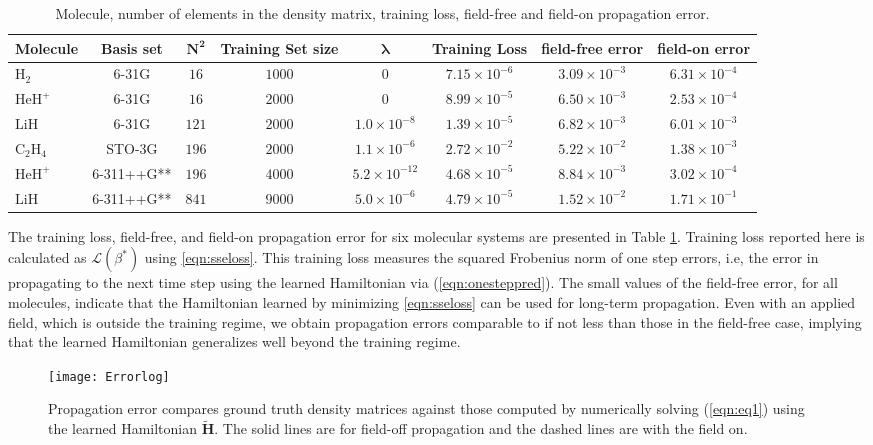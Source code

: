 \documentclass[10pt]{article}
\newcommand{\htwo}{\ensuremath{\text{H}_2} }
\newcommand{\heh}{\ensuremath{\text{HeH}^+} }
\newcommand{\lih}{\ensuremath{\text{LiH}} }
\newcommand{\ethylene}{\ensuremath{\text{C}_2\text{H}_4} }
\begin{document}
\begin{table}[h]%
\centering
\small
\caption{Molecule, number of elements in the density matrix, training loss, field-free and field-on propagation error.\label{tab1}}%
\begin{tabular}{lccccccc}
\hline
\textbf{Molecule} &\textbf{Basis set}  &\textbf{$\mathbf{N^2}$}&\textbf{Training Set size} &${\mathbf{\lambda}}$  & \textbf{Training Loss}  & \textbf{field-free error}  & \textbf{field-on error} \\
\hline
\htwo & 6-31G &$16$&$1000$&$0$ & $7.15 \times 10^{-6}$& $3.09 \times 10^{-3}$ & $6.31 \times 10^{-4}$ \\
\heh & 6-31G &$16$&$2000$&$0$ &$8.99 \times 10^{-5}$ & $6.50 \times 10^{-3}$ & $2.53 \times 10^{-4}$\\
\lih &6-31G &$121$&$2000$& $1.0 \times 10^{-8}$ &$1.39 \times 10^{-5}$ & $6.82\times 10^{-3}$& $6.01\times 10^{-3}$\\
\ethylene & STO-3G& $196$& $2000$& $1.1 \times 10^{-6}$   &$2.72 \times 10^{-2}$  &$5.22 \times 10^{-2}$& $1.38 \times 10^{-3}$ \\
\heh & 6-311++G**&$196$& $4000$&$5.2 \times 10^{-12}$  & $4.68 \times 10^{-5}$ &$8.84 \times 10^{-3}$ & $3.02 \times 10^{-4}$\\
\lih &6-311++G** &$841$&$9000$ & $5.0 \times 10^{-6}$ & $4.79 \times 10^{-5}$& $1.52 \times 10^{-2}$& $1.71 \times 10^{-1}$\\
\hline
\end{tabular}

\end{table}

The training loss, field-free, and field-on propagation error for six molecular systems are presented in Table \ref{tab1}. Training loss reported here is calculated as $\mathcal{L}(\beta^*)$ using  \eqref{eqn:sseloss}. This training loss measures the squared Frobenius norm of one step errors, i.e, the error in propagating to the next time step using the learned Hamiltonian via (\ref{eqn:onesteppred}). The small values of the field-free error, for all molecules, indicate that the Hamiltonian learned by minimizing \eqref{eqn:sseloss} can be used for long-term propagation. Even with an applied field, which is outside the training regime, we obtain propagation errors comparable to if not less than those in the field-free case, implying that the learned Hamiltonian generalizes well beyond the training regime.
\begin{figure}[h!]
\centering
\texttt{[image: Errorlog]}
\caption{Propagation error compares ground truth density matrices against those computed by numerically solving (\ref{eqn:eq1}) using the learned Hamiltonian $\widetilde{\mathbf{H}}$. The solid lines are for field-off propagation and the dashed lines are with the field on.\label{fig:Errorprop}}
\end{figure}
\end{document}
